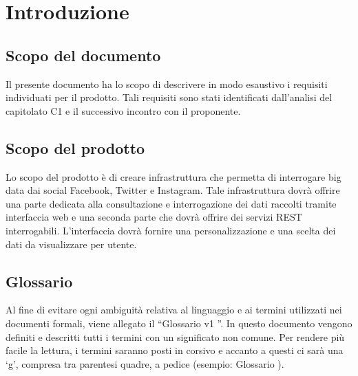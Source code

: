 %


\section{Introduzione}

\subsection{Scopo del documento}
Il presente documento ha lo scopo di descrivere in modo esaustivo i requisiti individuati per il prodotto. Tali requisiti sono stati identificati dall’analisi del capitolato C1 e il successivo incontro con il proponente.

\subsection{Scopo del prodotto}
Lo scopo del prodotto è di creare infrastruttura che permetta di interrogare big data dai social Facebook, Twitter e Instagram. Tale infrastruttura dovrà offrire una parte dedicata alla consultazione e interrogazione dei dati raccolti tramite interfaccia web e una seconda parte che dovrà offrire dei servizi REST interrogabili. L'interfaccia dovrà fornire una personalizzazione e una scelta dei dati da visualizzare per utente.

\subsection{Glossario}
Al fine di evitare ogni ambiguità relativa al linguaggio e ai termini utilizzati nei documenti formali, viene allegato il “Glossario v1 ”. In questo documento vengono definiti e descritti tutti i termini con un significato non comune. Per rendere più facile la lettura, i termini saranno posti in corsivo e accanto a questi ci sarà una ‘g’, compresa tra
parentesi quadre, a pedice (esempio: Glossario \ped{[g]}).

